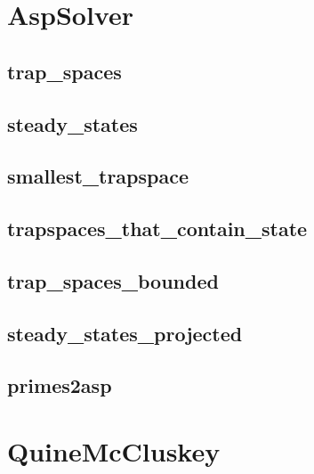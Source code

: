 \documentclass[letterpaper,10pt,english]{sphinxmanual}
\begin{document}
\section{AspSolver}
\label{\detokenize{AspSolver:aspsolver}}\label{\detokenize{AspSolver::doc}}\label{\detokenize{AspSolver:id1}}

\subsection{trap\_spaces}
\label{\detokenize{AspSolver:id2}}\label{\detokenize{AspSolver:trap-spaces}}

\subsection{steady\_states}
\label{\detokenize{AspSolver:steady-states}}\label{\detokenize{AspSolver:id3}}

\subsection{smallest\_trapspace}
\label{\detokenize{AspSolver:id4}}\label{\detokenize{AspSolver:smallest-trapspace}}

\subsection{trapspaces\_that\_contain\_state}
\label{\detokenize{AspSolver:trapspaces-that-contain-state}}\label{\detokenize{AspSolver:id5}}

\subsection{trap\_spaces\_bounded}
\label{\detokenize{AspSolver:trap-spaces-bounded}}\label{\detokenize{AspSolver:id6}}

\subsection{steady\_states\_projected}
\label{\detokenize{AspSolver:steady-states-projected}}\label{\detokenize{AspSolver:id7}}

\subsection{primes2asp}
\label{\detokenize{AspSolver:primes2asp}}\label{\detokenize{AspSolver:id8}}

\section{QuineMcCluskey}
\label{\detokenize{QuineMcCluskey:quinemccluskey}}\label{\detokenize{QuineMcCluskey:networkx-has-path}}\label{\detokenize{QuineMcCluskey::doc}}\label{\detokenize{QuineMcCluskey:id1}}
\end{document}
